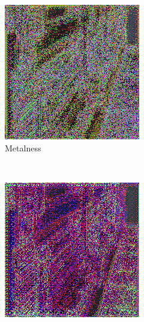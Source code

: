 \begin{figure}[h!]
\begin{subfigure}[b]{0.175\textwidth}
     \includegraphics[width=\textwidth]{figures/result/triple/albedo_normal_metalness/1.png}
     \caption{Metalness}
    \end{subfigure}
    ~
    \begin{subfigure}[b]{0.175\textwidth}
     \includegraphics[width=\textwidth]{figures/result/triple/albedo_normal_position/1.png}

\end{subfigure}
\end{figure}
